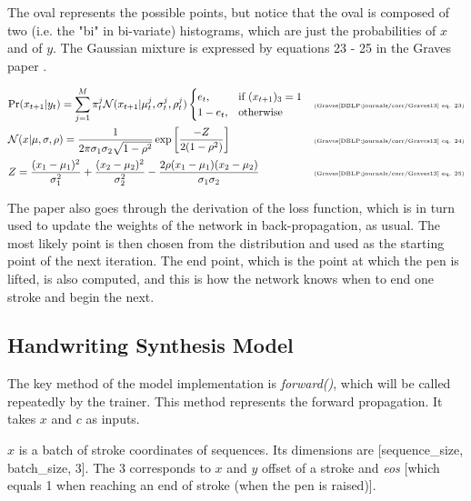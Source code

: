 \documentclass{article}
\begin{document}
The oval represents the possible points, but notice that the oval is composed of two (i.e. the "bi" in bi-variate) histograms, which are just the probabilities of $x$ and of $y$. The Gaussian mixture is expressed by equations 23 - 25 in the Graves paper \cite{DBLP:journals/corr/Graves13}.

    \begin{align}
        \label{eqn:gr23} &\text{Pr}(x_{t+1}\vert y_t) = \sum_{j=1}^M\pi_t^j\mathcal{N}(x_{t+1}\vert\mu_t^j,\sigma_t^j,\rho_t^j)
        \begin{cases}
            e_t,& \text{if } (x_{t+1})_3=1\\
            1 - e_t,& \text{otherwise}
        \end{cases} &
        \text{\tiny{(Graves\cite{DBLP:journals/corr/Graves13} eq. 23)}} \\
        \label{eqn:gr24} &\mathcal{N}(x\vert\mu,\sigma,\rho) = \frac{1}{2\pi\sigma_1\sigma_2\sqrt{1-\rho^2}}\exp\left[\frac{-Z}{2(1-\rho^2)}\right] & \text{\tiny{(Graves\cite{DBLP:journals/corr/Graves13} eq. 24)}} \\
        \label{eqn:gr25} &Z = \frac{(x_1-\mu_1)^2}{\sigma_1^2} + \frac{(x_2 - \mu_2)^2}{\sigma_2^2} - \frac{2\rho(x_1-\mu_1)(x_2-\mu_2)}{\sigma_1\sigma_2} & \text{\tiny{(Graves\cite{DBLP:journals/corr/Graves13} eq. 25)}}
    \end{align}

The paper \cite{DBLP:journals/corr/Graves13} also goes through the derivation of the loss function, which is in turn used to update the weights of the network in back-propagation, as usual. The most likely point is then chosen from the distribution and used as the starting point of the next iteration. The end point, which is the point at which the pen is lifted, is also computed, and this is how the network knows when to end one stroke and begin the next.

\subsection{Handwriting Synthesis Model}
The key method of the model implementation is \textit{forward()}, which will be called repeatedly by the trainer. This method represents the forward propagation. It takes $x$ and $c$ as inputs.

$x$ is a batch of stroke coordinates of sequences. Its dimensions are [sequence\_size, batch\_size, 3]. The 3 corresponds to $x$ and $y$ offset of a stroke and \textit{eos} [which equals 1 when reaching an end of stroke (when the pen is raised)].
\end{document}
